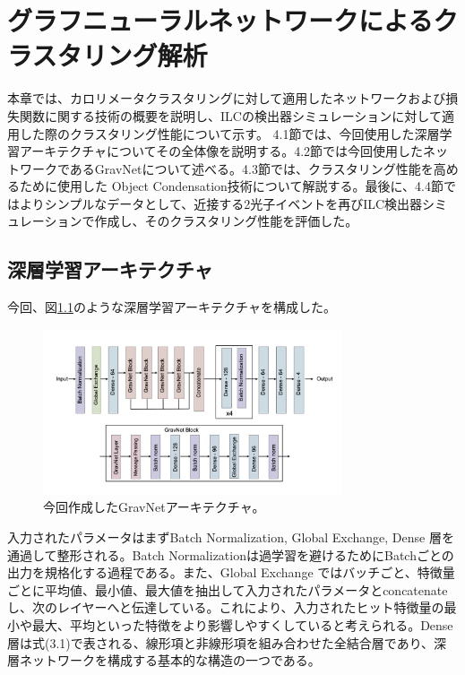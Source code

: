 
\chapter{グラフニューラルネットワークによるクラスタリング解析} \label{sec:BeamTest}

本章では、カロリメータクラスタリングに対して適用したネットワークおよび損失関数に関する技術の概要を説明し、ILCの検出器シミュレーションに対して適用した際のクラスタリング性能について示す。
4.1節では、今回使用した深層学習アーキテクチャについてその全体像を説明する。4.2節では今回使用したネットワークであるGravNetについて述べる。4.3節では、クラスタリング性能を高めるために使用した Object Condensation技術について解説する。最後に、4.4節ではよりシンプルなデータとして、近接する2光子イベントを再びILC検出器シミュレーションで作成し、そのクラスタリング性能を評価した。

\section{深層学習アーキテクチャ}
今回、図\ref{GravArc}のような深層学習アーキテクチャを構成した。
\begin{figure}[H]
	\begin{center}
		\includegraphics[width=250pt]{./Figure/DLAnalysis/GravArc.png}
		\caption[作成したGravNetアーキテクチャ]{今回作成したGravNetアーキテクチャ。}
		\label{GravArc}
	\end{center}
\end{figure}

入力されたパラメータはまずBatch Normalization, Global Exchange, Dense 層を通過して整形される。Batch Normalizationは過学習を避けるためにBatchごとの出力を規格化する過程である。また、Global Exchange ではバッチごと、特徴量ごとに平均値、最小値、最大値を抽出して入力されたパラメータとconcatenateし、次のレイヤーへと伝達している。これにより、入力されたヒット特徴量の最小や最大、平均といった特徴をより影響しやすくしていると考えられる。Dense層は式(3.1)で表される、線形項と非線形項を組み合わせた全結合層であり、深層ネットワークを構成する基本的な構造の一つである。

